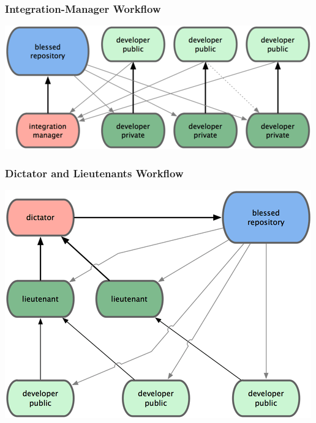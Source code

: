 \documentclass[english,compress]{beamer}
\begin{document}
\frame
{
    \frametitle{Integration-Manager Workflow}

    \begin{center}
        \includegraphics[width=.7\textwidth]{figs/integration-manager-workflow.png}\cite{book}
    \end{center}

}

\frame
{
    \frametitle{Dictator and Lieutenants Workflow}

    \begin{center}
        \includegraphics[width=.7\textwidth]{figs/dictator-lieutenant-workflow.png}\cite{book}
    \end{center}

}
\end{document}
